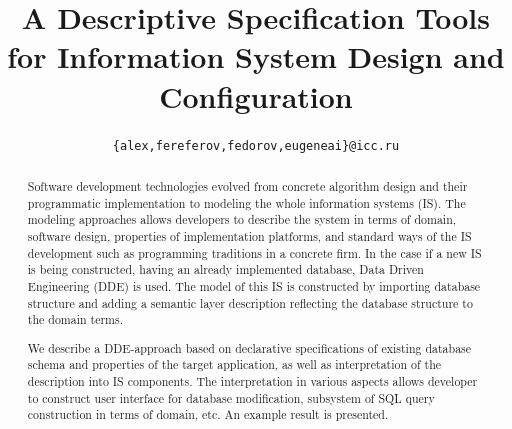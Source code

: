 \documentclass[conference]{IEEEtran}
\begin{document}
\title{A Descriptive Specification Tools for Information System Design and Configuration}
  \author{%
\texttt{\small \{alex,fereferov,fedorov,eugeneai\}@icc.ru}
}


\maketitle

\def\thepage{Page \arabic{page}}

\begin{abstract}
Software development technologies evolved from concrete algorithm design and their programmatic implementation to modeling the whole information systems (IS).  The modeling approaches allows developers to describe the system in terms of domain, software design, properties of implementation platforms, and standard ways of the IS development such as programming traditions in a concrete firm.  In the case if a new IS is being constructed, having an already implemented database, Data Driven Engineering (DDE) is used.  The model of this IS is constructed by importing database structure and adding a semantic layer description reflecting the database structure to the domain terms.

We describe a DDE-approach based on declarative specifications of existing database schema and properties of the target application, as well as interpretation of the description into IS components.  The interpretation in various aspects allows developer to construct user interface for database modification, subsystem of SQL query construction in terms of domain, etc.  An example result is presented.

\end{abstract}
\end{document}
